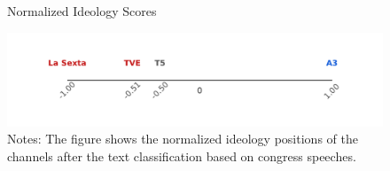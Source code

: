\documentclass[12pt]{article}
\begin{document}
	
	
	\begin{figure}[H]
		\centering
		\caption{Normalized Ideology Scores}
		\includegraphics[width=120mm]{figures/congress_line}
		\caption*{\small Notes: The figure shows the normalized ideology positions of the channels after the text classification based on congress speeches. }
		\label{fig:congress_line}
	\end{figure}
	
	

	
\end{document}
